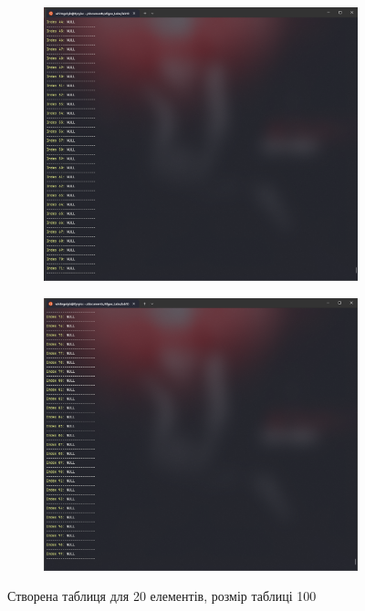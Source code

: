 \begin{figure}[h!]
  \begin{subfigure}[t]{0.45\textwidth}
      \centering
      \includegraphics[width=\textwidth]{reports/algos/lab10/assets/3.png}
  \end{subfigure}
  \hfill
  \begin{subfigure}[t]{0.45\textwidth}
      \centering
      \includegraphics[width=\textwidth]{reports/algos/lab10/assets/4.png}
  \end{subfigure}
  
  \caption{Створена таблиця для 20 елементів, розмір таблиці 100}
\end{figure}

